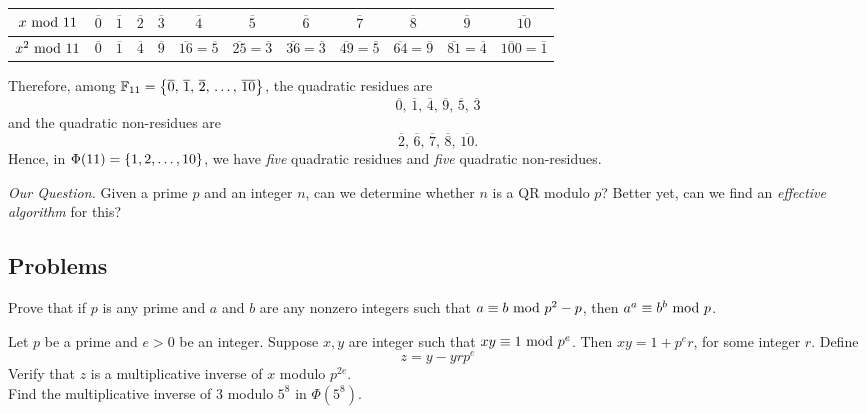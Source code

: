 \begin{center}
{\renewcommand{\arraystretch}{1.5}%
\begin{tabular}{|c|c|c|c|c|c|c|c|c|c|c|c|}
\hline
$x\text{ mod }{11}$ & $\overline{0}$ & $\overline{1}$ & $\overline{2}$ & $\overline{3}$ & $\overline{4}$ & $\overline{5}$ & $\overline{6}$ & $\overline{7}$ & $\overline{8}$ & $\overline{9}$ & $\overline{10}$\\
\hline
$x^2\text{ mod }{11}$ & $\overline{0}$ & $\overline{1}$ & $\overline{4}$ & $\overline{9}$ & $\overline{16} = \overline{5}$ & $\overline{25} = \overline{3}$ & $\overline{36} = \overline{3}$ & $\overline{49} = \overline{5}$ & $\overline{64} = \overline{9}$ & $\overline{81} = \overline{4}$ & $\overline{100} = \overline{1}$\\
\hline
\end{tabular}}
\end{center}
Therefore, among $\mathbb F_{11} = \left\{\overline{0},\,\overline{1},\,\overline{2},\,\ldots,\,\overline{10}\right\}$, the quadratic residues are
\[\overline{0},\,\overline{1},\,\overline{4},\,\overline{9},\,\overline{5},\,\overline{3}\]
and the quadratic non-residues are
\[\overline{2},\,\overline{6},\,\overline{7},\,\overline{8},\,\overline{10}.\]
Hence, in $\Phi(11) = \left\{1,2,\ldots,10\right\}$, we have \emph{five} quadratic residues and \emph{five} quadratic non-residues.

\vspace*{2em}

\emph{Our Question.} Given a prime $p$ and an integer $n$, can we determine whether $n$ is a QR modulo $p$? Better yet, can we find an \emph{effective algorithm} for this?

\vspace*{0.4in}

\subsection{Problems}
\vspace{0.1in}

\begin{problem}\label{Problem 15.1}
Prove that if $p$ is any prime and $a$ and $b$ are any nonzero integers such that $a \equiv b \text{ mod }{p^2 - p}$, then $a^a \equiv b^b \text{ mod }{p}$.
\end{problem}

\vspace*{0.1in}

\begin{problem}\label{Problem 15.2}
Let $p$ be a prime and $e>0$ be an integer. Suppose $x,y$ are integer such that $xy \equiv 1 \text{ mod }{p^e}$. Then $xy = 1 + p^er$, for some integer $r$. Define
\[z = y - yrp^e\]
Verify that $z$ is a multiplicative inverse of $x$ modulo $p^{2e}$.\\[0.5em] Find the multiplicative inverse of $3$ modulo $5^8$ in $\Phi(5^8)$.
\end{problem}

